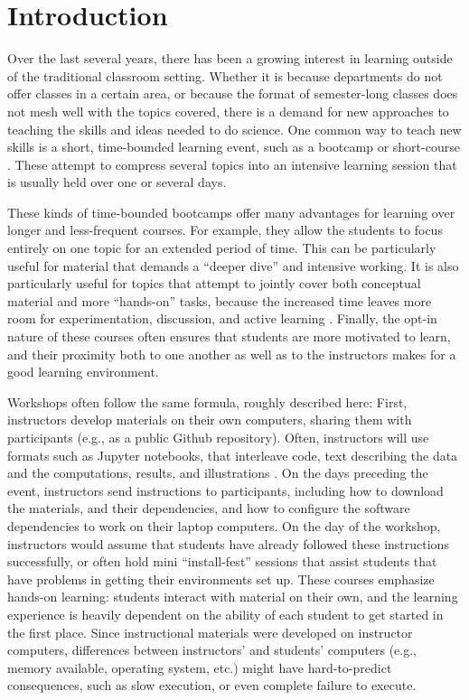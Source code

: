 \section{Introduction}

Over the last several years, there has been a growing interest in learning
outside of the traditional classroom setting. Whether it is because departments
do not offer classes in a certain area, or because the format of semester-long
classes does not mesh well with the topics covered, there is a demand for new
approaches to teaching the skills and ideas needed to do science. One common way
to teach new skills is a short, time-bounded learning event, such as a bootcamp
or short-course \cite{wilson2016software}. These attempt to compress several
topics into an intensive learning session that is usually held over one or
several days.

These kinds of time-bounded bootcamps offer many advantages for learning over
longer and less-frequent courses. For example, they allow the students to focus
entirely on one topic for an extended period of time. This can be particularly
useful for material that demands a ``deeper dive'' and intensive working. It is
also particularly useful for topics that attempt to jointly cover both
conceptual material and more ``hands-on'' tasks, because the increased time
leaves more room for experimentation, discussion, and active learning
\citep{Bransford2000-lu, Papert1980-fh}. Finally, the opt-in nature of these
courses often ensures that students are more motivated to learn, and their
proximity both to one another as well as to the instructors makes for a good
learning environment.

Workshops often follow the same formula, roughly described here: First,
instructors develop materials on their own computers, sharing them with
participants (e.g., as a public Github repository). Often, instructors will use
formats such as Jupyter notebooks, that interleave code, text describing the
data and the computations, results, and illustrations
\cite{kluyver2016jupyter}. On the days preceding the event, instructors send
instructions to participants, including how to download the materials, and their
dependencies, and how to configure the software dependencies to work on their
laptop computers. On the day of the workshop, instructors would assume that
students have already followed these instructions successfully, or often hold
mini ``install-fest'' sessions that assist students that have problems in
getting their environments set up. These courses emphasize hands-on learning:
students interact with material on their own, and the learning experience is
heavily dependent on the ability of each student to get started in the first
place. Since instructional materials were developed on instructor computers,
differences between instructors' and students' computers (e.g., memory
available, operating system, etc.) might have hard-to-predict consequences, such
as slow execution, or even complete failure to execute.

